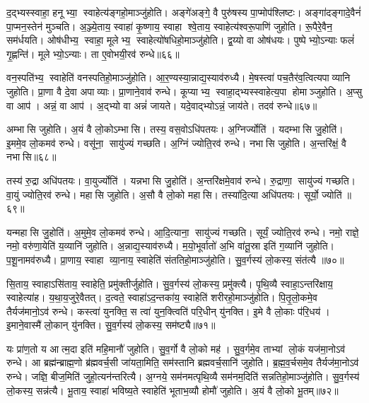 द॒द्भ्यस्स्वाहा॒ हनूभ्या॒ स्वाहेत्य॑ङ्गहो॒माञ्जु॑होति। अङ्गे॑अङ्गे॒ वै पुरु॑षस्य पा॒प्मोप॑श्लिष्टः। अङ्गा॑दङ्गादे॒वैनं॑ पा॒प्मन॒स्तेन॑ मुञ्चति। अ॒ञ्ज्ये॒ताय॒ स्वाहा॑ कृ॒ष्णाय॒ स्वाहा श्वे॒ताय॒ स्वाहेत्य॑श्वरू॒पाणि॑ जुहोति। रू॒पैरे॒वैन॒ सम॑र्धयति। ओष॑धीभ्य॒ स्वाहा॒ मूलेभ्य॒ स्वाहेत्यो॑षधिहो॒माञ्जु॑होति। द्व॒य्यो वा ओष॑धयः। पुष्पेभ्यो॒ऽन्याः फलं॑ गृ॒ह्णन्ति॑। मूलेभ्यो॒ऽन्याः। ता ए॒वोभयी॒रव॑ रुन्धे॥६६॥

वन॒स्पति॑भ्य॒ स्वाहेति॑ वनस्पतिहो॒माञ्जु॑होति। आ॒र॒ण्यस्या॒न्नाद्य॒स्याव॑रुध्यै। मे॒षस्त्वा॑ पच॒तैर॑व॒त्वित्यपाव्यानि जुहोति। प्रा॒णा वै दे॒वा अपाव्याः। प्रा॒णाने॒वाव॑ रुन्धे। कूप्याभ्य॒ स्वाहा॒द्भ्यस्स्वाहेत्य॒पा होमाञ्जुहोति। अ॒प्सु वा आप॑। अन्नं॒ वा आप॑। अ॒द्भ्यो वा अन्नं॑ जायते। यदे॒वाद्भ्योऽन्नं॒ जाय॑ते। तदव॑ रुन्धे॥६७॥\anuvakamend[पू॒र्व॒दी॒क्षा जु॑होति॒ पूर्व॑ ए॒व द्वि॒षन्तं॒ भ्रातृ॑व्य॒मति॑ क्राम॒त्यन॑न्तरित्यै क्रामति रुन्धे॒ जाय॑त॒ एकं॑ च]

अम्भासि जुहोति। अ॒यं वै लो॒कोऽम्भासि। तस्य॒ वस॒वोऽधि॑पतयः। अ॒ग्निर्ज्योति॑। यदम्भासि जु॒होति॑। इ॒ममे॒व लो॒कमव॑ रुन्धे। वसू॑ना॒ सायु॑ज्यं गच्छति। अ॒ग्निं ज्योति॒रव॑ रुन्धे। नभासि जुहोति। अ॒न्तरि॑क्षं॒ वै नभासि॥६८॥

तस्य॑ रु॒द्रा अधि॑पतयः। वा॒युर्ज्योति॑। यन्नभासि जु॒होति॑। अ॒न्तरि॑क्षमे॒वाव॑ रुन्धे। रु॒द्राणा॒ सायु॑ज्यं गच्छति। वा॒युं ज्योति॒रव॑ रुन्धे। महासि जुहोति। अ॒सौ वै लो॒को महासि। तस्या॑दि॒त्या अधि॑पतयः। सूर्यो॒ ज्योति॑॥६९॥

यन्महासि जु॒होति॑। अ॒मुमे॒व लो॒कमव॑ रुन्धे। आ॒दि॒त्याना॒ सायु॑ज्यं गच्छति। सूर्यं॒ ज्योति॒रव॑ रुन्धे। नमो॒ राज्ञे॒ नमो॒ वरु॑णा॒येति॑ य॒व्यानि॑ जुहोति। अ॒न्नाद्य॒स्याव॑रुध्यै। म॒यो॒भूर्वातो॑ अ॒भि वा॑तू॒स्रा इति॑ ग॒व्यानि॑ जुहोति। प॒शू॒नामव॑रुध्यै। प्रा॒णाय॒ स्वाहा व्या॒नाय॒ स्वाहेति॑ संततिहो॒माञ्जु॑होति। सु॒व॒र्गस्य॑ लो॒कस्य॒ संत॑त्यै ॥७०॥

सि॒ताय॒ स्वाहाऽसि॑ताय॒ स्वाहेति॒ प्रमु॑क्तीर्जुहोति। सु॒व॒र्गस्य॑ लो॒कस्य॒ प्रमु॑क्त्यै। पृ॒थि॒व्यै स्वाहा॒ऽन्तरि॑क्षाय॒ स्वाहेत्या॑ह। य॒था॒य॒जुरे॒वैतत्। द॒त्वते॒ स्वाहा॑ऽद॒न्तका॑य॒ स्वाहेति॑ शरीरहो॒माञ्जु॑होति। पि॒तृ॒लो॒कमे॒व तैर्यज॑मानो॒ऽव॑ रुन्धे। कस्त्वा॑ युनक्ति॒ स त्वा॑ युन॒क्त्विति॑ परि॒धीन् यु॑नक्ति। इ॒मे वै लो॒काः प॑रि॒धय॑। इ॒माने॒वास्मै॑ लो॒कान् यु॑नक्ति। सु॒व॒र्गस्य॑ लो॒कस्य॒ सम॑ष्ट्यै॥७१॥

यः प्रा॑ण॒तो य आत्म॒दा इति॑ महि॒मानौ॑ जुहोति। सु॒व॒र्गो वै लो॒को मह॑। सु॒व॒र्गमे॒व ताभ्यां लो॒कं यज॑मा॒नोऽव॑ रुन्धे। आ ब्रह्म॑न्ब्राह्म॒णो ब्र॑ह्मवर्च॒सी जा॑यता॒मिति॒ सम॑स्तानि ब्रह्मवर्च॒सानि॑ जुहोति। ब्र॒ह्म॒व॒र्चसमे॒व तैर्यज॑मा॒नोऽव॑ रुन्धे। जज्ञि॒ बीज॒मिति॑ जुहो॒त्यन॑न्तरित्यै। अ॒ग्नये॒ सम॑नमत्पृथि॒व्यै सम॑नम॒दिति॑ सन्नतिहो॒माञ्जु॑होति। सु॒व॒र्गस्य॑ लो॒कस्य॒ सन्न॑त्यै। भू॒ताय॒ स्वाहा॑ भविष्य॒ते स्वाहेति॑ भूताभ॒व्यौ होमौ॑ जुहोति। अ॒यं वै लो॒को भू॒तम्॥७२॥

